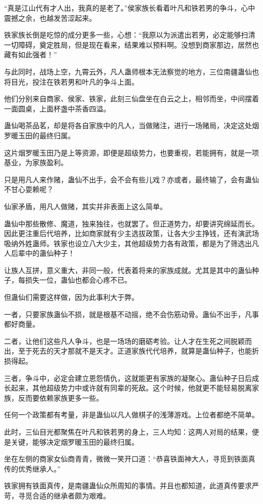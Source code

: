 \begin{this_body}
“真是江山代有才人出，我真的是老了。”侯家族长看着叶凡和铁若男的争斗，心中震撼之余，也越发苦涩起来。

铁家族长倒是吃惊的成分更多一些，心想：“我原以为派遣出若男，必定能够扫清一切障碍，奠定胜局，但是现在看来，结果难以预料啊。没想到商家那边，居然也藏有如此强者！”

与此同时，战场上空，九霄云外，凡人蛊师根本无法察觉的地方，三位南疆蛊仙也将目光，投注在铁若男和叶凡的争斗上面。

他们分别来自商家、侯家、铁家，此刻三仙盘坐在白云之上，相邻而坐，中间摆着一面圆桌，上面杯盏中茶香四溢。

蛊仙喝茶品茗，却是将各自家族中的凡人，当做赌注，进行一场赌局，决定这处烟罗暖玉田的最终归属。

这片烟罗暖玉田乃是上等资源，即便是超级势力，也要重视，若能拥有，就是一项基业，为家族盈利。

只是用凡人来作赌，蛊仙不出手，会不会有些儿戏？亦或者，最终输了，会有蛊仙不甘心耍赖呢？

仙家矛盾，用凡人做赌，其实并非表面上这么简单。

蛊仙中那些散修、魔道，独来独往，也就罢了。但正道势力，却要讲究绵延而长。因此更注重后代培养，比如商家就有少主选拔政策，让各大少主挣钱，还有演武场吸纳外姓蛊师。铁家也设立八大少主，其他超级势力各有政策，都是为了筛选出凡人后辈中的蛊仙种子！

让族人互拼，意义重大，非同一般，代表着将来的家族成就。尤其是其中的蛊仙种子，每损失一位，蛊仙也都会心疼不已。

但蛊仙们需要这样做，因为此事利大于弊。

一者，只要家族蛊仙不损，就是根基不动摇，绝不会伤筋动骨。蛊仙不出手，凡事都好商量。

二者，让他们这些凡人争斗，也是一场场的磨砺考验。让人才在生死之间脱颖而出，至于死去的天才那就不是天才。正道家族代代培养，就算是蛊仙种子，也能折损得起。

三者，争斗中，必定会建立恩怨情仇，这就能更有家族的凝聚心。蛊仙种子日后成长起来，其他超级势力中或许就有同辈的死敌。这个时候，他就更不能轻易脱离家族，反而要依赖家族更多一些。

任何一个政策都有考量，非是蛊仙以凡人做棋子的浅薄游戏。上位者都绝不简单。

此时，三仙目光都聚焦在叶凡和铁若男的身上，三人均知：这两人对局的结果，便是关键，能够决定烟罗暖玉田的最终归属。

坐在左侧的商家女仙商青青，微微一笑开口道：“恭喜铁面神大人，寻觅到铁面真传的优秀继承人。”

铁家拥有铁面真传，是南疆蛊仙众所周知的事情。并且也都知道，此道真传要求严苛，寻觅合适的继承者颇为艰难。


\end{this_body}
